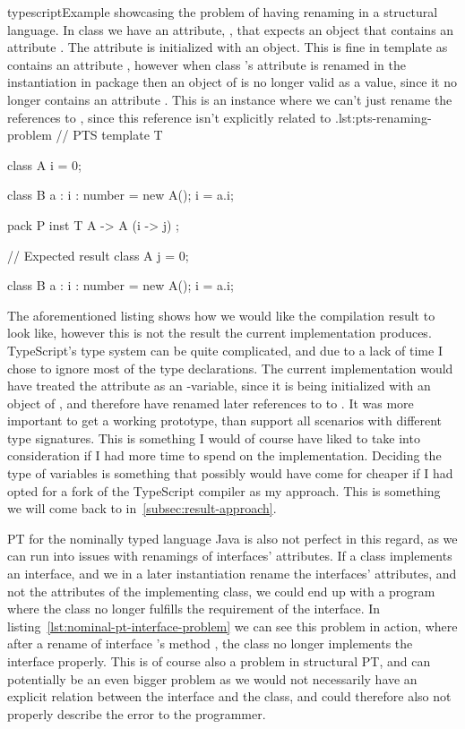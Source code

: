 \begin{code}{typescript}{Example showcasing the problem of having renaming in a structural language. In class  we have an attribute, , that expects an object that contains an attribute . The attribute is initialized with an  object. This is fine in template  as  contains an attribute , however when class 's attribute is renamed in the instantiation in package  then an object of  is no longer valid as a value, since it no longer contains an attribute . This is an instance where we can't just rename the references to , since this reference isn't explicitly related to .}{lst:pts-renaming-problem}
    // PTS
    template T {
        class A {
            i = 0;
        }

        class B {
            a : { i : number } = new A();
            i = a.i;
        }
    }

    pack P {
        inst T { A -> A (i -> j) };
    }

    // Expected result
    class A {
        j = 0;
    }

    class B {
        a : { i : number } = new A();
        i = a.i;
    }
\end{code}

The aforementioned listing shows how we would like the compilation result to look like, however this is not the result the current implementation produces.
TypeScript's type system can be quite complicated, and due to a lack of time I chose to ignore most of the type declarations.
The current implementation would have treated the attribute  as an -variable, since it is being initialized with an object of , and therefore have renamed later references to  to .
It was more important to get a working prototype, than support all scenarios with different type signatures.
This is something I would of course have liked to take into consideration if I had more time to spend on the implementation.
Deciding the type of variables is something that possibly would have come for cheaper if I had opted for a fork of the TypeScript compiler as my approach.
This is something we will come back to in~\vref{subsec:result-approach}.

PT for the nominally typed language Java is also not perfect in this regard, as we can run into issues with renamings of interfaces' attributes.
If a class implements an interface, and we in a later instantiation rename the interfaces' attributes, and not the attributes of the implementing class, we could end up with a program where the class no longer fulfills the requirement of the interface.
In listing~\vref{lst:nominal-pt-interface-problem} we can see this problem in action, where after a rename of interface 's method , the class  no longer implements the interface properly.
This is of course also a problem in structural PT, and can potentially be an even bigger problem as we would not necessarily have an explicit relation between the interface and the class, and could therefore also not properly describe the error to the programmer.

